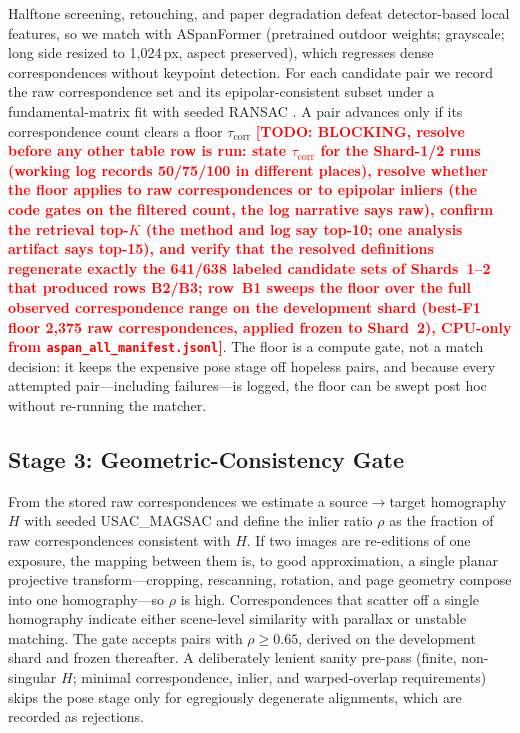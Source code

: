 \documentclass[letterpaper]{article} %
\newcommand{\todo}[1]{\textcolor{red}{\textbf{[TODO: #1]}}}
\begin{document}
Halftone screening, retouching, and paper degradation defeat detector-based
local features, so we match with ASpanFormer \citep{chen2022aspanformer}
(pretrained outdoor weights; grayscale; long side resized to 1{,}024\,px,
aspect preserved), which regresses dense correspondences without keypoint
detection. For each candidate pair we record the raw correspondence set and
its epipolar-consistent subset under a fundamental-matrix fit with seeded
RANSAC \citep[\texttt{FM\_RANSAC}, 1\,px reprojection threshold,
\texttt{cv2.setRNGSeed} before every robust
fit;][]{fischler1981ransac,bradski2000opencv}. A pair advances only if its
correspondence count clears a floor $\tau_{\mathrm{corr}}$
\todo{BLOCKING, resolve before any other table row is run: state
$\tau_{\mathrm{corr}}$ for the Shard-1/2 runs (working log records
50/75/100 in different places), resolve whether the floor applies to raw
correspondences or to epipolar inliers (the code gates on the filtered
count, the log narrative says raw), confirm the retrieval top-$K$ (the
method and log say top-10; one analysis artifact says top-15), and verify
that the resolved definitions
regenerate exactly the 641/638 labeled candidate sets of Shards~1--2 that
produced rows B2/B3; row~B1 sweeps the floor over the full observed
correspondence range on the development shard (best-F1 floor 2{,}375 raw
correspondences, applied frozen to Shard~2), CPU-only from
\texttt{aspan\_all\_manifest.jsonl}}. The floor is a compute
gate, not a match decision: it keeps the expensive pose stage off hopeless
pairs, and because every attempted pair---including failures---is logged,
the floor can be swept post hoc without re-running the matcher.

\subsection{Stage 3: Geometric-Consistency Gate}

From the stored raw correspondences we estimate a source$\to$target
homography $H$ with seeded USAC\_MAGSAC \citep[5\,px
threshold;][]{barath2020magsac} and define the inlier ratio $\rho$ as the
fraction of raw correspondences consistent with $H$. If two images are
re-editions of one exposure, the mapping between them is, to good
approximation, a single planar projective transform---cropping, rescanning,
rotation, and page geometry compose into one homography---so $\rho$ is
high. Correspondences that scatter off a single homography indicate either
scene-level similarity with parallax or unstable matching. The gate accepts
pairs with $\rho \ge 0.65$, derived on the development shard and frozen
thereafter. A deliberately lenient sanity pre-pass (finite, non-singular
$H$; minimal correspondence, inlier, and warped-overlap requirements) skips
the pose stage only for egregiously degenerate alignments, which are
recorded as rejections.
\end{document}
